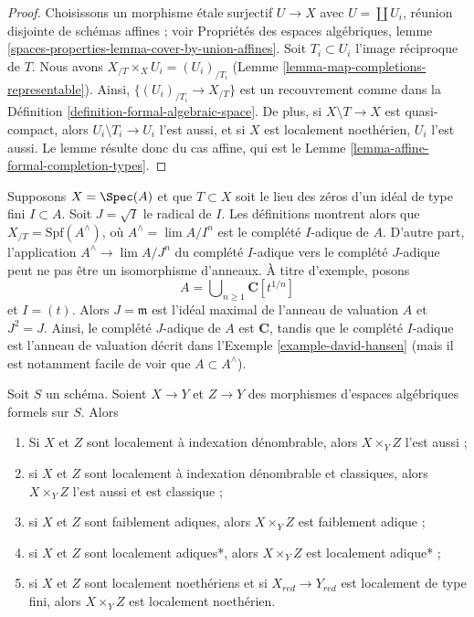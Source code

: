 \begin{proof}
Choisissons un morphisme étale surjectif $U \to X$ avec $U = \coprod U_i$,
réunion disjointe de schémas affines ; voir Propriétés des espaces algébriques, lemme
\ref{spaces-properties-lemma-cover-by-union-affines}.
Soit $T_i \subset U_i$ l'image réciproque de $T$.
Nous avons $X_{/T} \times_X U_i = (U_i)_{/T_i}$
(Lemme \ref{lemma-map-completions-representable}).
Ainsi, $\{(U_i)_{/T_i} \to X_{/T}\}$ est un recouvrement comme dans la
Définition \ref{definition-formal-algebraic-space}.
De plus, si $X \setminus T \to X$ est quasi-compact, alors
$U_i \setminus T_i \to U_i$ l'est aussi, et si $X$ est localement noethérien,
$U_i$ l'est aussi. Le lemme résulte donc du cas affine, qui est le
Lemme \ref{lemma-affine-formal-completion-types}.
\end{proof}

\begin{remark}[Avertissement]
\label{remark-warning-completion}
Supposons $X = \Spec(A)$ et que $T \subset X$ soit le lieu des zéros d'un
idéal de type fini $I \subset A$. Soit $J = \sqrt{I}$ le
radical de $I$. Les définitions montrent alors que
$X_{/T} = \text{Spf}(A^\wedge)$, où $A^\wedge = \lim A/I^n$ est
le complété $I$-adique de $A$. D'autre part, l'application
$A^\wedge \to \lim A/J^n$ du complété $I$-adique vers
le complété $J$-adique peut ne pas être un isomorphisme d'anneaux.
À titre d'exemple, posons
$$
A = \bigcup\nolimits_{n \geq 1} \mathbf{C}[t^{1/n}]
$$
et $I = (t)$. Alors $J = \mathfrak m$ est l'idéal maximal
de l'anneau de valuation $A$ et $J^2 = J$. Ainsi, le complété $J$-adique
de $A$ est $\mathbf{C}$, tandis que le complété $I$-adique
est l'anneau de valuation décrit dans l'Exemple \ref{example-david-hansen}
(mais il est notamment facile de voir que $A \subset A^\wedge$).
\end{remark}

\begin{lemma}
\label{lemma-types-fibre-products}
Soit $S$ un schéma. Soient $X \to Y$ et $Z \to Y$ des
morphismes d'espaces algébriques formels sur $S$. Alors
\begin{enumerate}
\item Si $X$ et $Z$ sont localement à indexation dénombrable, alors $X \times_Y Z$
l'est aussi ;
\item si $X$ et $Z$ sont localement à indexation dénombrable et classiques,
alors $X \times_Y Z$ l'est aussi et est classique ;
\item si $X$ et $Z$ sont faiblement adiques, alors $X \times_Y Z$
est faiblement adique ;
\item si $X$ et $Z$ sont localement adiques*, alors $X \times_Y Z$ est
localement adique* ;
\item si $X$ et $Z$ sont localement noethériens et si $X_{red} \to Y_{red}$
est localement de type fini, alors $X \times_Y Z$ est localement noethérien.
\end{enumerate}
\end{lemma}

